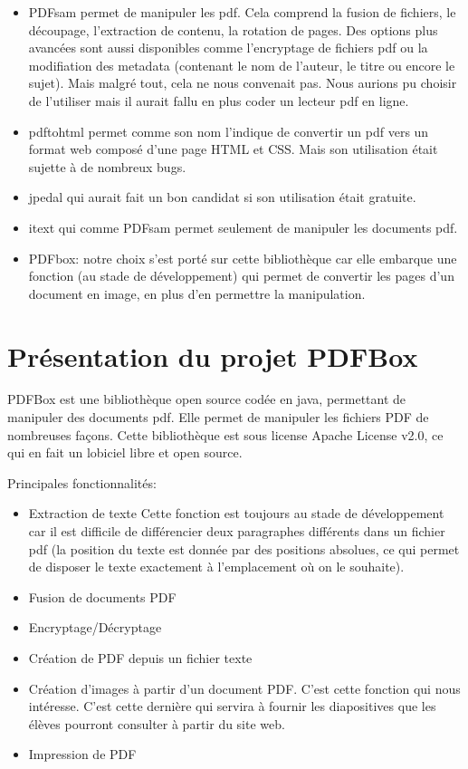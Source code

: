     \begin{itemize}
    \item PDFsam permet de manipuler les pdf. Cela comprend la fusion de 
     fichiers, le découpage, l'extraction de contenu, la rotation de pages.
     Des options plus avancées sont aussi disponibles comme l'encryptage de fichiers
     pdf ou la modifiation des metadata (contenant le nom de l'auteur,
     le titre ou encore le sujet). Mais malgré tout, cela ne nous convenait pas.
     Nous aurions pu choisir de l'utiliser mais il aurait fallu en plus coder un lecteur 
     pdf en ligne.
     \item pdftohtml permet comme son nom l'indique de convertir un pdf 
     vers un format web composé d'une page HTML et CSS. Mais son utilisation était sujette à de nombreux bugs.
     \item jpedal qui aurait fait un bon candidat si son utilisation était gratuite.
     \item itext qui comme PDFsam permet seulement de manipuler les 
     documents pdf.
     \item PDFbox: notre choix s'est porté sur cette bibliothèque car elle embarque une 
     fonction (au stade de développement) qui permet de convertir les pages d'un
     document en image, en plus d'en permettre la manipulation.
    \end{itemize}

    \section{Présentation du projet PDFBox}

PDFBox est une bibliothèque open source codée en java, permettant de manipuler 
des documents pdf. Elle permet de manipuler les fichiers PDF de nombreuses façons.
Cette bibliothèque est sous license Apache License v2.0, ce qui en fait un lobiciel libre et open source.

Principales fonctionnalités:

    \begin{itemize}
    \item Extraction de texte
           Cette fonction est toujours au stade de développement car il est difficile de 
           différencier deux paragraphes différents dans un fichier pdf (la position 
           du texte est donnée par des positions absolues, ce qui permet de disposer 
           le texte exactement à l'emplacement où on le souhaite).
	\item Fusion de documents PDF
	\item Encryptage/Décryptage
	\item Création de PDF depuis un fichier texte
	\item Création d'images à partir d'un document PDF. C'est cette fonction qui nous intéresse.
           C'est cette dernière qui servira à fournir les diapositives que les élèves pourront consulter à partir 
           du site web.
	\item Impression de PDF
	\end{itemize}

